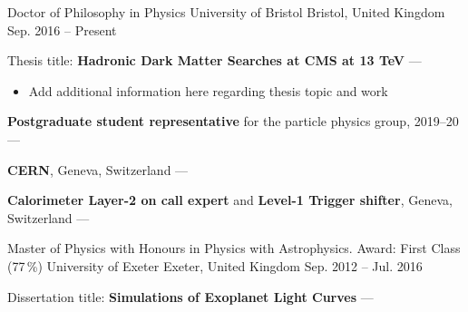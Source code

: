 
\newcommand{\vpaddingEdu}{\vspace{0.5mm}}

\begin{cventries}
    \cventry
        {Doctor of Philosophy in Physics} %
        {University of Bristol} %
        {Bristol, United Kingdom} %
        {Sep. 2016 -- Present} %
        {
        \begin{cvitems} %
            \item {Thesis title: \textbf{Hadronic Dark Matter Searches at CMS at 13 TeV} --- }
            \begin{itemize}
                \item[\bullet]{Add additional information here regarding thesis topic and work}
            \end{itemize}
            \vpaddingEdu
            \item {\textbf{Postgraduate student representative} for the particle physics group, 2019--20 --- }
            \vpaddingEdu
            \item {\textbf{CERN}, Geneva, Switzerland --- }
            \vpaddingEdu
            \item {\textbf{Calorimeter Layer-2 on call expert} and \textbf{Level-1 Trigger shifter}, Geneva, Switzerland --- }
        \end{cvitems}
        }

    \cventry
        {Master of Physics with Honours in Physics with Astrophysics. Award: First Class (77\,\%)}
        {University of Exeter}
        {Exeter, United Kingdom}
        {Sep. 2012 -- Jul. 2016}
        {
        \begin{cvitems} %
            \item {Dissertation title: \textbf{Simulations of Exoplanet Light Curves} --- }
        \end{cvitems}
        } %


\end{cventries}
